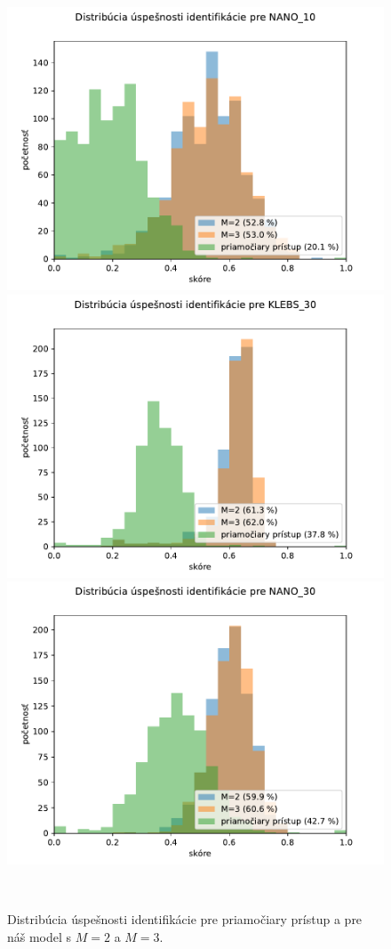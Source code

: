 \begin{figure}[!ht]
\begin{center}
\begin{minipage}{\textwidth}
     \includegraphics[width=.47\textwidth]{plots/6_uspesnost_nanolution_10}\\
     \includegraphics[width=.47\textwidth]{plots/6_uspesnost_klebs_30}\quad
     \includegraphics[width=.47\textwidth]{plots/6_uspesnost_nanolution_30}
   \end{minipage}\\[1em]   
   \end{center}
\caption{Distribúcia úspešnosti identifikácie pre priamočiary prístup a pre náš model s $M=2$ a $M=3$.}
\label{fig:uspesnost_final}
\end{figure}


